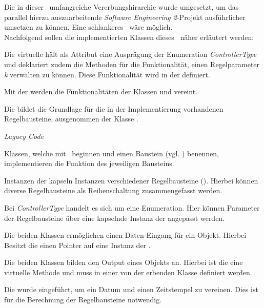 Die in dieser \Pack\ umfangreiche Vererbungshirarchie wurde umgesetzt, um das parallel hierzu auszuarbeitende \textit{Software Engineering 2}-Projekt ausführlicher umsetzen zu können. Eine schlankeres \Pack\ wäre möglich.\\
Nachfolgend sollen die implementierten Klassen dieses \Pack\ näher erläutert werden:


Die virtuelle  hält als Attribut eine Ausprägung der Enumeration \textit{ControllerType} und deklariert zudem die Methoden für die Funktionalität, einen Regelparameter \textit{k} verwalten zu können. Diese Funktionalität wird in der  definiert.


Mit der  werden die Funktionalitäten der Klassen  und  vereint.


Die  bildet die Grundlage für die in der Implementierung vorhandenen Regelbausteine, ausgenommen der Klasse .


\textit{Lagacy Code}



Klassen, welche mit \glqq {}\grqq\ beginnen und einen Baustein (vgl. ) benennen, implementieren die Funktion des jeweiligen Bausteins.


Instanzen der  kapseln Instanzen verschiedener Regelbausteine (). Hierbei können diverse Regelbausteine als Reihenschaltung zusammengefasst werden.\\


Bei \textit{ControllerType} handelt es sich um eine Enumeration. Hier können Parameter der Regelbausteine über eine kapselnde Instanz der  angepasst werden.\\


Die beiden Klassen ermöglichen einen Daten-Eingang für ein Objekt. Hierbei Besitzt die  einen Pointer auf eine Instanz der .


Die beiden Klassen bilden den Output eines Objekts an. Hierbei ist die  eine virtuelle Methode und muss in einer von der  erbenden Klasse definiert werden.


Die  wurde eingeführt, um ein Datum und einen Zeitstempel zu vereinen. Dies ist für die Berechnung der Regelbausteine notwendig.
